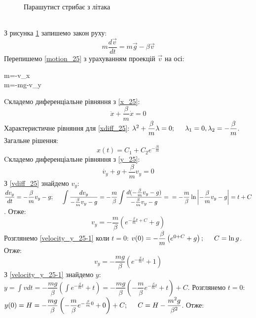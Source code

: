 \documentclass[a4paper,12pt]{article}
\newcommand\tab [1][0.5cm]{\hspace*{#1}}
\newcommand\dint{\displaystyle\int}
\begin{document}
\begin{justify}
\begin{itemize}
\begin{figure}[htp]
			\caption{Парашутист стрибає з літака}
			\label{plot_25}
			\end{figure}\\
			З рисунка \ref{plot_25} запишемо закон руху:
			\begin{equation}
				m\dfrac{d\vec{v}}{dt}=m\vec{g}-\beta \vec{v}
				\label{motion_25}
			\end{equation} 
			Перепишемо \ref{motion_25} з урахуванням проекцій $\vec{v}$ на осі:
			\begin{numcases}
				\>m=-\beta v_x\label{x_25}\\
				m=-mg-\beta v_y\label{y_25}	 
			\end{numcases}
			Cкладемо диференціальне рівняння з \ref{x_25}:
			\begin{equation}
				\ddot{x}+\dfrac{\beta}{m}\dot{x}=0
				\label{xdiff_25}
			\end{equation}
			Характеристичне рівняння для \ref{xdiff_25}: $\lambda^2+\dfrac{\beta}{m}\lambda=0;\tab\lambda_1=0,\lambda_2=-\dfrac{\beta}{m}$. Загальне рішення:
			\begin{equation}
				x(t)=C_1+C_2e^{-\frac{\beta t}{m}}
				\label{xeq_25-1}
			\end{equation}
			Cкладемо диференціальне рівняння з \ref{y_25}:
			\begin{equation}
				\dot{v_y}+g+\dfrac{\beta}{m}v_y=0
				\label{vdiff_25}
			\end{equation}
			З \ref{vdiff_25} знайдемо $v_y$: $\dfrac{dv_y}{dt}=-\dfrac{\beta}{m}v_y-g;\tab \dint\dfrac{dv_y}{-\frac{\beta}{m}v_y-g}=-\dfrac{m}{\beta}\dint\dfrac{d(-\frac{\beta}{m}v_y-g)}{-\frac{\beta}{m}v_y-g}=\\=-\dfrac{m}{\beta}\ln\left|-\frac{\beta}{m}v_y-g\right|=t+C$. Отже:
			\begin{equation}
				v_y=-\dfrac{m}{\beta}\left(e^{-\frac{\beta}{m}t+C}+g\right)
				\label{velocity_y_25-1}
			\end{equation}
			Розглянемо \ref{velocity_y_25-1} коли $t=0$: $v(0)=-\dfrac{\beta}{m}\left(e^{0+C}+g\right);\tab C=\ln g$. Отже:
			\begin{equation}
				v_y=-\dfrac{mg}{\beta}\left(e^{-\frac{\beta}{m}t}+1\right)
				\label{velocity_y_25}
			\end{equation}
			З \ref{velocity_y_25-1} знайдемо $y$: $y=\dint vdt=-\dfrac{mg}{\beta}\left(\dint e^{-\frac{\beta}{m}t}+t\right)=-\dfrac{mg}{\beta}\left(-\dfrac{m}{\beta}e^{-\frac{\beta}{m}t}+t\right)+C$. Розглянемо $t=0$: $y(0)=H=-\dfrac{mg}{\beta}\left(-\dfrac{m}{\beta}e^{-\frac{\beta}{m}0}+0\right)+C;\tab C=H-\dfrac{m^2g}{\beta^2}$. Отже:

\end{itemize}
\end{justify}
\end{document}
